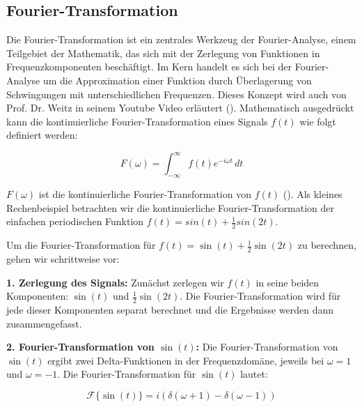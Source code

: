 \documentclass[11pt,a4paper]{article}
\begin{document}
\subsection{Fourier-Transformation}
Die Fourier-Transformation ist ein zentrales Werkzeug der Fourier-Analyse, einem Teilgebiet der 
Mathematik, das sich mit der Zerlegung von Funktionen in Frequenzkomponenten beschäftigt. 
Im Kern handelt es sich bei der Fourier-Analyse um die Approximation einer Funktion durch 
Überlagerung von Schwingungen mit unterschiedlichen Frequenzen. Dieses Konzept wird auch von 
Prof. Dr. Weitz in seinem Youtube Video erläutert (\cite[2:20]{weitz2023fourier}). 
Mathematisch ausgedrückt kann die kontinuierliche Fourier-Transformation eines Signals \( f(t) \) 
wie folgt definiert werden:

\begin{equation*}
F(\omega) = \int_{-\infty}^{\infty} f(t) e^{-i \omega t} \, dt
\label{eq:fourier_transform}
\end{equation*}

\noindent
\newline
\(F(\omega)\) ist die kontinuierliche Fourier-Transformation von \(f(t)\) 
(\cite[49:27]{weitz2023fourier}). Als kleines Rechenbeispiel betrachten wir die kontinuierliche
Fourier-Transformation der einfachen periodischen Funktion \(f(t) = sin(t) + \frac{1}{2}sin(2t)\). 

\noindent
\newline
Um die Fourier-Transformation für \( f(t) = \sin(t) + \frac{1}{2}\sin(2t) \) zu berechnen, 
gehen wir schrittweise vor:

\noindent
\newline
\textbf{1. Zerlegung des Signals:}  
Zunächst zerlegen wir \( f(t) \) in seine beiden Komponenten: \( \sin(t) \) und 
\( \frac{1}{2}\sin(2t) \). Die Fourier-Transformation wird für jede dieser Komponenten separat 
berechnet und die Ergebnisse werden dann zusammengefasst.

\noindent
\newline
\textbf{2. Fourier-Transformation von \( \sin(t) \):}  
Die Fourier-Transformation von \( \sin(t) \) ergibt zwei Delta-Funktionen in der Frequenzdomäne, 
jeweils bei \( \omega = 1 \) und \( \omega = -1 \). Die Fourier-Transformation für \( \sin(t) \) 
lautet:

\begin{equation*}
\mathcal{F}\{\sin(t)\} = i \left( \delta(\omega + 1) - \delta(\omega - 1) \right)
\end{equation*}
\end{document}
